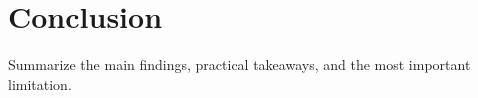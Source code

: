 \section{Conclusion}

Summarize the main findings, practical takeaways, and the most important limitation.

